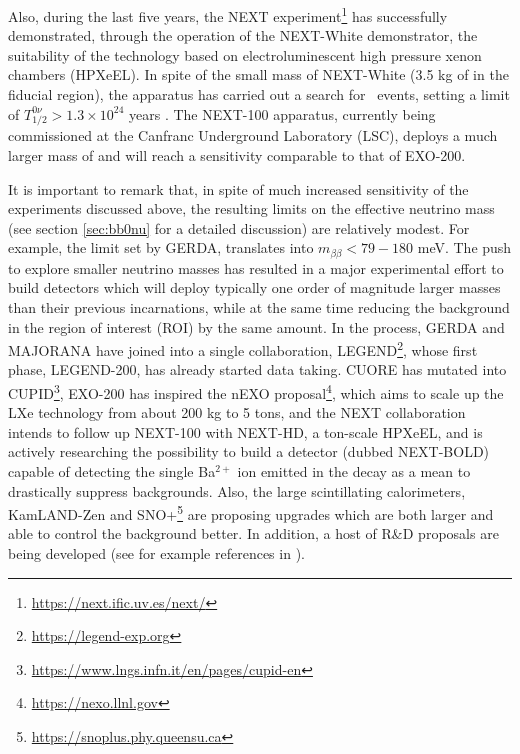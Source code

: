 Also, during the last five years, the NEXT experiment\footnote{\url{https://next.ific.uv.es/next/}} has successfully demonstrated, through the operation of the NEXT-White demonstrator, the suitability of the technology based on electroluminescent high pressure xenon chambers (HPXeEL). In spite of the small mass of NEXT-White (3.5 kg of  in the fiducial region), the apparatus has carried out a search for \bbonu\ events, setting a limit of \mbox{$T^{0\nu}_{1/2} > 1.3 \times 10^{24}$} years  \cite{NEXT:2023daz}. The NEXT-100 apparatus, currently being commissioned at the Canfranc Underground Laboratory (LSC), deploys a much larger mass of  and will reach a sensitivity comparable to that of EXO-200.  

It is important to remark that, in spite of much increased sensitivity of the experiments discussed above, the resulting limits on the effective neutrino mass (see section \ref{sec:bb0nu} for a detailed discussion) are relatively modest. For example, the limit set by GERDA, translates into \mbox{$m_{\beta\beta} < 79-180$} meV. The push to explore smaller neutrino masses has resulted in a major experimental effort to build 
detectors which will deploy typically one order of magnitude larger masses than their previous incarnations, while at the same time reducing the background in the region of interest (ROI) by the same amount. In the process, GERDA and MAJORANA have joined into a single collaboration, LEGEND\footnote{\url{https://legend-exp.org}}, whose first phase, LEGEND-200, has already started data taking. CUORE has mutated into CUPID\footnote{\url{https://www.lngs.infn.it/en/pages/cupid-en}}, EXO-200 has inspired the nEXO proposal\footnote{\url{https://nexo.llnl.gov}}, which aims to scale up the LXe technology from about 200 kg to 5 tons, and the NEXT collaboration intends to follow up NEXT-100 with NEXT-HD, a ton-scale HPXeEL, and is actively researching the possibility to build a detector (dubbed NEXT-BOLD) capable of detecting the single Ba$^{2+}$ ion emitted in the decay as a mean to drastically suppress backgrounds. Also, the large scintillating calorimeters, KamLAND-Zen and SNO+\footnote{\url{https://snoplus.phy.queensu.ca}} are proposing upgrades which are both larger and able to control the background better. In addition, a host of R\&D proposals are being developed (see for example references in \cite{Dell_Oro_2016}). 

